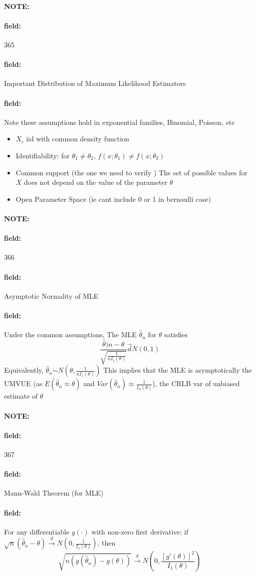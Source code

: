 \documentclass[12pt]{article}
\newenvironment{note}{\paragraph{NOTE:}}{}
\newenvironment{field}{\paragraph{field:}}{}
\begin{document}
\begin{note}
    \begin{field}
        \tiny 365
    \end{field}
    \begin{field}
        Important Distribution of Maximum Likelihood Estimators
    \end{field}
    \begin{field}
        Note these assumptions hold in exponential families, Binomial, Poisson, etc
        \begin{itemize}
          \item $X_i$ iid with common density function
          \item Identifiability: for $\theta_1 \neq \theta_2$, $f(x;\theta_1) \neq f(x;\theta_2)$
          \item Common support (the one we need to verify ) The set of possible values for $X$ does not depend on the value of the parameter $\theta$
          \item Open Parameter Space (ie cant include 0 or 1 in bernoulli case)
        \end{itemize}
    \end{field}
\end{note}


\begin{note}
    \begin{field}
        \tiny 366
    \end{field}
    \begin{field}
        Asymptotic Normality of MLE
    \end{field}
    \begin{field}
        Under the common assumptions, The MLE $\hat{\theta}_n$ for $\theta$ satisfies
        $$ \frac{\hat{\theta})n -\theta}{\sqrt{\frac{1}{n I_1(\theta)}}} \overset{\to}{d} N(0,1)$$
        Equivalently,
        $\hat{\theta}_n \dot\sim N(\theta, \frac{1}{nI_1(\theta)})$
        This implies that the MLE is asymptotically the UMVUE (as $E(\hat{\theta}_n \approx \theta)$ and $Var(\hat{\theta}_n) \approx \frac{1}{I_n(\theta)}$), the CRLB var of unbiased estimate of $\theta$
    \end{field}
\end{note}


\begin{note}
    \begin{field}
        \tiny 367
    \end{field}
    \begin{field}
        Mann-Wald Theorem (for MLE)
    \end{field}
    \begin{field}
        For any differentiable $g(\cdot)$ with non-zero first derivative:
        if $\sqrt{n}(\hat{\theta}_n - \theta) \overset{d}{\to} N(0, \frac{1}{I_1(\theta)})$, then
        $$\sqrt{n(g(\hat{\theta}_n) - g(\theta))} \overset{d}{\to} N(0,\frac{[g'(\theta)]^2}{I_1(\theta)}) $$
    \end{field}
\end{note}
\end{document}
